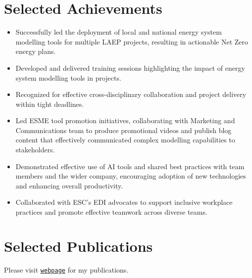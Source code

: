 \documentclass[letterpaper]{article}
\def\name{Dr Yang Wang}
\begin{document}
\vspace{-12pt}
\section*{Selected Achievements}
\begin{itemize}
\item Successfully led the deployment of local and national energy system modelling tools for multiple LAEP projects, resulting in actionable Net Zero energy plans.
\item Developed and delivered training sessions highlighting the impact of energy system modelling tools in projects.
\item Recognized for effective cross-disciplinary collaboration and project delivery within tight deadlines.
\item Led ESME tool promotion initiatives, collaborating with Marketing and Communications team to produce promotional videos and publish blog content that effectively communicated complex modelling capabilities to stakeholders.
\item Demonstrated effective use of AI tools and shared best practices with team members and the wider company, encouraging adoption of new technologies and enhancing overall productivity.
\item Collaborated with ESC's EDI advocates to support inclusive workplace practices and promote effective teamwork across diverse teams.
\end{itemize}

\vspace{-12pt}
\section*{Selected Publications}
\vspace{-10pt}
Please visit \href{https://raw.githubusercontent.com/guliyolanda/CV/master/YW-papers.pdf} {\tt webpage} for  my publications. 


\end{document}
